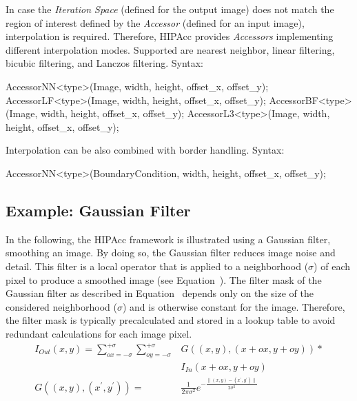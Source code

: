 \begin{itemize}
    In case the {\em Iteration Space} (defined for the output image) does not
    match the region of interest defined by the {\em Accessor} (defined for an
    input image), interpolation is required. Therefore, \ac{HIPAcc} provides
    {\em Accessors} implementing different interpolation modes. Supported are
    nearest neighbor, linear filtering, bicubic filtering, and Lanczos
    filtering. Syntax:\\
\begin{code}
AccessorNN<type>(Image, width, height, offset_x, offset_y);
AccessorLF<type>(Image, width, height, offset_x, offset_y);
AccessorBF<type>(Image, width, height, offset_x, offset_y);
AccessorL3<type>(Image, width, height, offset_x, offset_y);
\end{code}

    Interpolation can be also combined with border handling. Syntax:\\
\begin{code}
AccessorNN<type>(BoundaryCondition, width, height, offset_x, offset_y);
\end{code}
\end{itemize}


\subsection{Example: Gaussian Filter}\label{sec:gaussian_filter}
In the following, the \ac{HIPAcc} framework is illustrated using a Gaussian filter, smoothing an image. By doing so, the Gaussian filter reduces image noise and detail. This filter is a local operator that is applied to a neighborhood ($\sigma$) of each pixel to produce a smoothed image (see Equation~). The filter mask of the Gaussian filter as described in Equation~ depends only on the size of the considered neighborhood ($\sigma$) and is otherwise constant for the image. Therefore, the filter mask is typically precalculated and stored in a lookup table to avoid redundant calculations for each image pixel.
\begin{align}
    I_{Out}(x,y) = \sum_{ox=-\sigma}^{+\sigma} \sum_{oy=-\sigma}^{+\sigma} &G((x,y),(x+ox,y+oy)) *\nonumber\\
                                                                       &I_{In}(x+ox,y+oy) \label{eq:01} \\[2ex]
    G((x,y),(x^\prime,y^\prime)) = &\frac{1}{2\pi \sigma^2} e^{-\frac{\|(x,y) - (x^\prime,y^\prime)\|}{2 \sigma^2}} \label{eq:02}
\end{align}

